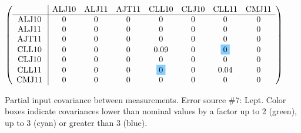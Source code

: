 \begin{table}[H]
\scriptsize
\begin{center}
\renewcommand{\arraystretch}{1.1}
\begin{math}\left(\begin{array}{c|ccccccc}
 & \mathrm{ALJ10} & 
\mathrm{ALJ11} & 
\mathrm{AJT11} & 
\mathrm{CLL10} & 
\mathrm{CLJ10} & 
\mathrm{CLL11} & 
\mathrm{CMJ11} \\
\hline
\mathrm{ALJ10} \hspace*{2pt} &  0 &  0 &  0 &  0 &  0 &  0 &  0 \\
\mathrm{ALJ11} \hspace*{2pt} &  0 &  0 &  0 &  0 &  0 &  0 &  0 \\
\mathrm{AJT11} \hspace*{2pt} &  0 &  0 &  0 &  0 &  0 &  0 &  0 \\
\mathrm{CLL10} \hspace*{2pt} &  0 &  0 &  0 &       0.09 &  0 &  \colorbox{SkyBlue1}{$ 0$} &  0 \\
\mathrm{CLJ10} \hspace*{2pt} &  0 &  0 &  0 &  0 &  0 &  0 &  0 \\
\mathrm{CLL11} \hspace*{2pt} &  0 &  0 &  0 &  \colorbox{SkyBlue1}{$ 0$} &  0 &       0.04 &  0 \\
\mathrm{CMJ11} \hspace*{2pt} &  0 &  0 &  0 &  0 &  0 &  0 &  0 \\
\end{array}\right)\end{math}
\caption{Partial input covariance between measurements. Error source \#7: Lept. Color boxes indicate covariances lower than nominal values by a factor up to 2 (green), up to 3 (cyan) or greater than 3 (blue).}
\renewcommand{\arraystretch}{1}
\end{center}
\end{table}
